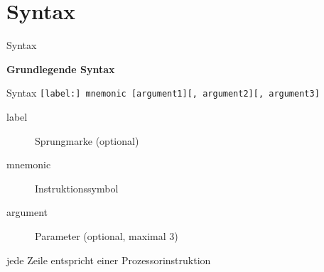 \section{Syntax}

\begin{frame}{Syntax}
\begin{center}
\textbf{Grundlegende Syntax}
\end{center}

  Syntax
  \texttt{[label:] mnemonic [argument1][, argument2][, argument3]}

  \makebox{}

  \begin{description}
    \item [label] Sprungmarke (optional)
    \item [mnemonic] Instruktionssymbol
    \item [argument] Parameter (optional, maximal 3)
  \end{description}

  \makebox{}

  jede Zeile entspricht einer Prozessorinstruktion
\end{frame}


